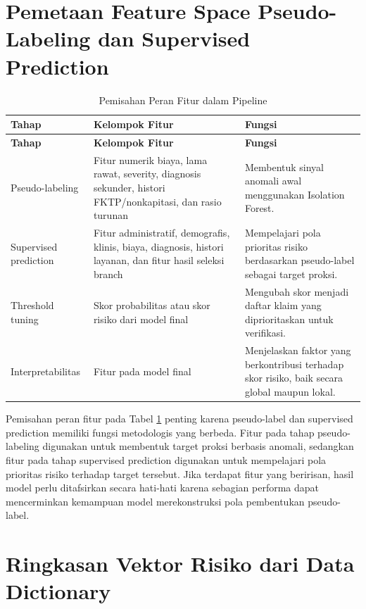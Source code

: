 \section{Pemetaan Feature Space Pseudo-Labeling dan Supervised Prediction}

\begin{longtable}[]{@{}p{}p{}p{}@{}}
\caption{Pemisahan Peran Fitur dalam Pipeline}\label{tab:lampiran-feature-space}\\
\toprule
\textbf{Tahap} & \textbf{Kelompok Fitur} & \textbf{Fungsi} \\
\midrule
\endfirsthead
\toprule
\textbf{Tahap} & \textbf{Kelompok Fitur} & \textbf{Fungsi} \\
\midrule
\endhead
\bottomrule
\endfoot
Pseudo-labeling & Fitur numerik biaya, lama rawat, severity, diagnosis sekunder, histori FKTP/nonkapitasi, dan rasio turunan & Membentuk sinyal anomali awal menggunakan Isolation Forest. \\
Supervised prediction & Fitur administratif, demografis, klinis, biaya, diagnosis, histori layanan, dan fitur hasil seleksi branch & Mempelajari pola prioritas risiko berdasarkan pseudo-label sebagai target proksi. \\
Threshold tuning & Skor probabilitas atau skor risiko dari model final & Mengubah skor menjadi daftar klaim yang diprioritaskan untuk verifikasi. \\
Interpretabilitas & Fitur pada model final & Menjelaskan faktor yang berkontribusi terhadap skor risiko, baik secara global maupun lokal. \\
\end{longtable}

Pemisahan peran fitur pada Tabel \ref{tab:lampiran-feature-space} penting karena pseudo-label dan supervised prediction memiliki fungsi metodologis yang berbeda. Fitur pada tahap pseudo-labeling digunakan untuk membentuk target proksi berbasis anomali, sedangkan fitur pada tahap supervised prediction digunakan untuk mempelajari pola prioritas risiko terhadap target tersebut. Jika terdapat fitur yang beririsan, hasil model perlu ditafsirkan secara hati-hati karena sebagian performa dapat mencerminkan kemampuan model merekonstruksi pola pembentukan pseudo-label.

\section{Ringkasan Vektor Risiko dari Data Dictionary}

